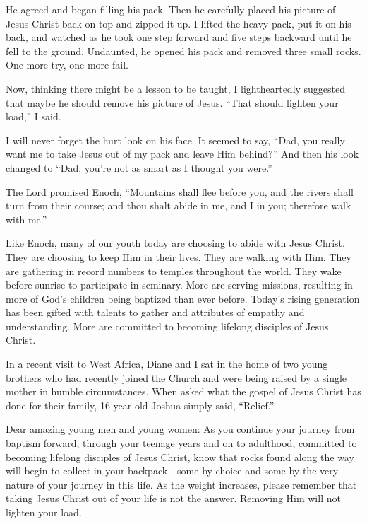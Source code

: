 \documentclass[letterpaper, 11pt]{report}
\newcommand{\intalkheader}[1]{
    \vspace{0.75em}
    \noindent{\normalsize\bfseries #1}
    \par\nopagebreak %
    \vspace{0.25em}
    \nopagebreak     %
}
\begin{document}
He agreed and began filling his pack. Then he carefully placed his picture of Jesus Christ back on top and zipped it up. I lifted the heavy pack, put it on his back, and watched as he took one step forward and five steps backward until he fell to the ground. Undaunted, he opened his pack and removed three small rocks. One more try, one more fail.

Now, thinking there might be a lesson to be taught, I lightheartedly suggested that maybe he should remove his picture of Jesus. “That should lighten your load,” I said.

I will never forget the hurt look on his face. It seemed to say, “Dad, you really want me to take Jesus out of my pack and leave Him behind?” And then his look changed to “Dad, you’re not as smart as I thought you were.”

\intalkheader{Jesus Christ Is Your Relief—He Has Overcome the World}

The Lord promised Enoch, “Mountains shall flee before you, and the rivers shall turn from their course; and thou shalt abide in me, and I in you; therefore walk with me.”

Like Enoch, many of our youth today are choosing to abide with Jesus Christ. They are choosing to keep Him in their lives. They are walking with Him. They are gathering in record numbers to temples throughout the world. They wake before sunrise to participate in seminary. More are serving missions, resulting in more of God’s children being baptized than ever before. Today’s rising generation has been gifted with talents to gather and attributes of empathy and understanding. More are committed to becoming lifelong disciples of Jesus Christ.

In a recent visit to West Africa, Diane and I sat in the home of two young brothers who had recently joined the Church and were being raised by a single mother in humble circumstances. When asked what the gospel of Jesus Christ has done for their family, 16-year-old Joshua simply said, “Relief.”

Dear amazing young men and young women: As you continue your journey from baptism forward, through your teenage years and on to adulthood, committed to becoming lifelong disciples of Jesus Christ, know that rocks found along the way will begin to collect in your backpack—some by choice and some by the very nature of your journey in this life. As the weight increases, please remember that taking Jesus Christ out of your life is not the answer. Removing Him will not lighten your load.
\end{document}
